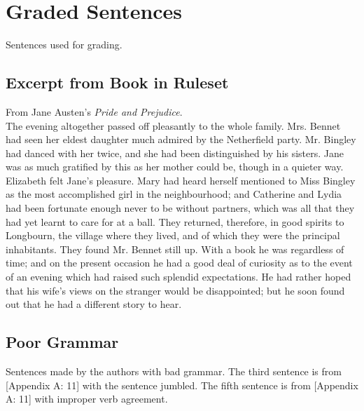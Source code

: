\documentclass[11pt,a4paper]{article}
\begin{document}
\section{Graded Sentences}
Sentences used for grading.

\subsection{Excerpt from Book in Ruleset}
From Jane Austen's \textit{Pride and Prejudice}.\\

The evening altogether passed off pleasantly to the whole family. Mrs.
Bennet had seen her eldest daughter much admired by the Netherfield
party. Mr. Bingley had danced with her twice, and she had been
distinguished by his sisters. Jane was as much gratified by this as
her mother could be, though in a quieter way. Elizabeth felt Jane's
pleasure. Mary had heard herself mentioned to Miss Bingley as the most
accomplished girl in the neighbourhood; and Catherine and Lydia had been
fortunate enough never to be without partners, which was all that they
had yet learnt to care for at a ball. They returned, therefore, in good
spirits to Longbourn, the village where they lived, and of which they
were the principal inhabitants. They found Mr. Bennet still up. With
a book he was regardless of time; and on the present occasion he had a
good deal of curiosity as to the event of an evening which had raised
such splendid expectations. He had rather hoped that his wife's views on
the stranger would be disappointed; but he soon found out that he had a
different story to hear.

\subsection{Poor Grammar}
Sentences made by the authors with bad grammar. The third sentence is from [Appendix A: 11] with the sentence jumbled. The fifth sentence is from [Appendix A: 11] with improper verb agreement.\\
\end{document}
